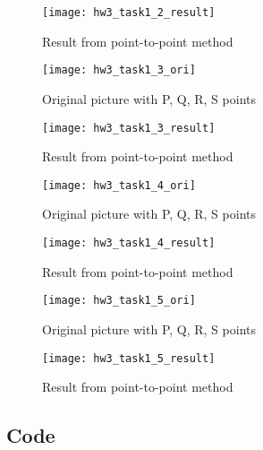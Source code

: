 \documentclass[11pt]{article}
\begin{document}
\begin{figure}[H]
\centering
\texttt{[image: hw3\_task1\_2\_result]}
\caption{Result from point-to-point method}
\label{}
\end{figure}

\begin{figure}[H]
\centering
\texttt{[image: hw3\_task1\_3\_ori]}
\caption{Original picture with P, Q, R, S points}
\label{}
\end{figure}

\begin{figure}[H]
\centering
\texttt{[image: hw3\_task1\_3\_result]}
\caption{Result from point-to-point method}
\label{}
\end{figure}

\begin{figure}[H]
\centering
\texttt{[image: hw3\_task1\_4\_ori]}
\caption{Original picture with P, Q, R, S points}
\label{}
\end{figure}

\begin{figure}[H]
\centering
\texttt{[image: hw3\_task1\_4\_result]}
\caption{Result from point-to-point method}
\label{}
\end{figure}

\begin{figure}[H]
\centering
\texttt{[image: hw3\_task1\_5\_ori]}
\caption{Original picture with P, Q, R, S points}
\label{}
\end{figure}

\begin{figure}[H]
\centering
\texttt{[image: hw3\_task1\_5\_result]}
\caption{Result from point-to-point method}
\label{}
\end{figure}


\subsection*{Code}
\end{document}
